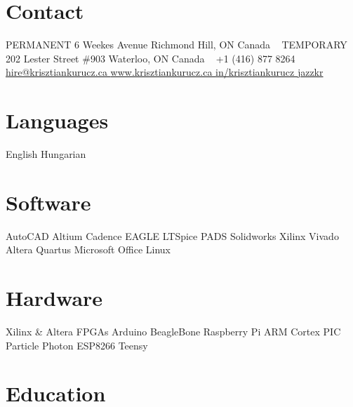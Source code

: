 \documentclass[hidelinks]{kkurucz-cv}
\begin{document}


\begin{aside} %
\section{Contact}
{\headingfont PERMANENT}
6 Weekes Avenue
Richmond Hill, ON
Canada
~
{\headingfont TEMPORARY}
202 Lester Street \#903
Waterloo, ON
Canada
~
{+1 (416) 877 8264\hspace{1.5mm}\mobile}
~
\href{mailto:hire@krisztiankurucz.ca}{hire@krisztiankurucz.ca }\mail
\href{http://www.krisztiankurucz.ca}{www.krisztiankurucz.ca }\website
\href{http://ca.linkedin.com/in/krisztiankurucz}{in/krisztiankurucz }\linkedin
\href{http://www.github.com/jazzkr}{jazzkr }\github
\section{Languages}
English
Hungarian
\section{Software}
AutoCAD
Altium
Cadence
EAGLE
LTSpice
PADS
Solidworks
Xilinx Vivado
Altera Quartus
Microsoft Office
Linux
\section{Hardware}
Xilinx \& Altera FPGAs
Arduino
BeagleBone
Raspberry Pi
ARM Cortex
PIC
Particle Photon
ESP8266
Teensy
\end{aside}



\vspace{-4mm}
\section{Education}
\end{document}
